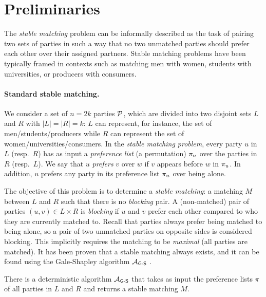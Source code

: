 \section{Preliminaries}

The \emph{stable matching} problem can be informally described as the task of pairing two sets of parties in such a way that 
no two unmatched parties should prefer each other over their assigned partners.
Stable matching problems have been typically framed in contexts such as matching men with women, students with universities, or producers with consumers.

\paragraph{Standard stable matching.}
We consider a set of $n = 2k$ parties $\mathcal{P}$, which are divided into two disjoint sets $L$ and $R$ with $|L| = |R| = k$: $L$ can represent, for instance, the set of men/students/producers while $R$ can represent the set of women/universities/consumers. 
In the \emph{stable matching problem}, every party $u$ in $L$ (resp.~$R$) has as input a \emph{preference list} (a permutation) $\pi_u$ over the parties in $R$ (resp.~$L$).  We say that $u$ \emph{prefers} $v$ over $w$ if $v$ appears before $w$ in $\pi_u$. In addition, $u$ prefers any party in its preference list $\pi_{u}$ over being alone.

The objective of this problem
is to determine a \emph{stable matching}: a matching $M$ between $L$ and $R$ such that there is no \emph{blocking} pair.
A (non-matched) pair of parties $(u, v) \in L \times R$ is \emph{blocking} if $u$ and $v$ prefer each other compared to who they are currently matched to. 
Recall that parties always prefer being matched to being alone, so a pair of two unmatched parties on opposite sides is considered blocking.
This implicitly requires the matching to be \emph{maximal} (all parties are matched). 
It has been proven that 
a stable matching always exists, and it can be found using the Gale-Shapley algorithm $\mathcal{A}_\textsf{G-S}$ \cite{GaleShapley}.
\begin{theorem} \label{theorem:gale-shapley}
    There is a deterministic algorithm $\mathcal{A}_\textsf{G-S}$ that takes as input the preference lists $\pi$ of all parties in $L$ and $R$ and returns a stable matching $M$.
\end{theorem}

